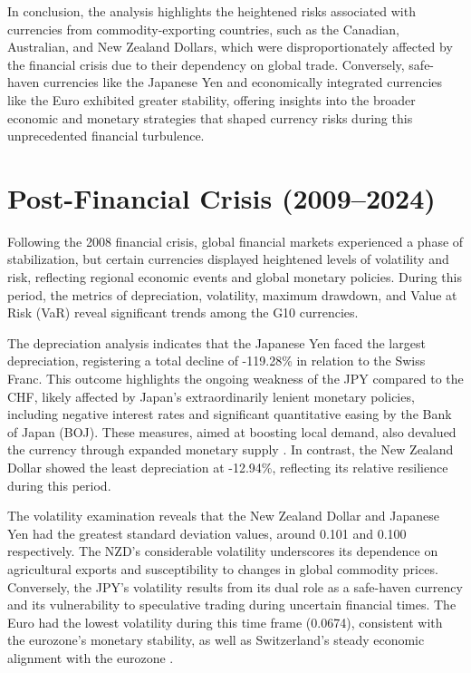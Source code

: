 \documentclass[11pt,a4paper,english,oneside]{book}
\begin{document}
In conclusion, the analysis highlights the heightened risks associated with currencies from commodity-exporting countries, such as the Canadian, Australian, and New Zealand Dollars, which were disproportionately affected by the financial crisis due to their dependency on global trade. Conversely, safe-haven currencies like the Japanese Yen and economically integrated currencies like the Euro exhibited greater stability, offering insights into the broader economic and monetary strategies that shaped currency risks during this unprecedented financial turbulence.

\section{Post-Financial Crisis (2009–2024)}
Following the 2008 financial crisis, global financial markets experienced a phase of stabilization, but certain currencies displayed heightened levels of volatility and risk, reflecting regional economic events and global monetary policies. During this period, the metrics of depreciation, volatility, maximum drawdown, and Value at Risk (VaR) reveal significant trends among the G10 currencies.

The depreciation analysis indicates that the Japanese Yen faced the largest depreciation, registering a total decline of -119.28\% in relation to the Swiss Franc. This outcome highlights the ongoing weakness of the JPY compared to the CHF, likely affected by Japan's extraordinarily lenient monetary policies, including negative interest rates and significant quantitative easing by the Bank of Japan (BOJ). These measures, aimed at boosting local demand, also devalued the currency through expanded monetary supply \parencite{shirai2020bank}. In contrast, the New Zealand Dollar showed the least depreciation at -12.94\%, reflecting its relative resilience during this period.

The volatility examination reveals that the New Zealand Dollar and Japanese Yen had the greatest standard deviation values, around 0.101 and 0.100 respectively. The NZD's considerable volatility underscores its dependence on agricultural exports and susceptibility to changes in global commodity prices. Conversely, the JPY's volatility results from its dual role as a safe-haven currency and its vulnerability to speculative trading during uncertain financial times. The Euro had the lowest volatility during this time frame (0.0674), consistent with the eurozone's monetary stability, as well as Switzerland's steady economic alignment with the eurozone \parencite{claessens2010cross}.
\end{document}
